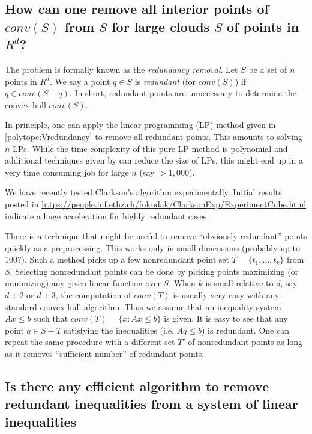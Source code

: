 \documentclass[[a4paper,12pt]{article}
\begin{document}
\subsection{How can one remove all interior points of $conv(S)$ from $S$ 
for large clouds $S$ of points in $R^d$?}
\label{polytope:Vredundancy2}

The problem is formally known as the {\em redundancy removal}.
Let $S$ be a set of $n$ points in $R^d$.
We say a point $q \in S$ is {\em redundant\/} (for $conv(S)$) if
$q \in conv(S-q)$.   In short, redundant points are unnecessary
to determine the convex hull $conv(S)$.

In principle, one can apply the linear programming (LP)
 method given in \ref{polytope:Vredundancy}
to remove all redundant points.  This amounts to solving $n$ LPs.
  While the time complexity of this pure LP method is polynomial and
additional techniques given by \cite{c-mosga-94,oss-eephd-95} 
can reduce the size of LPs, 
this might end up in
 a very time consuming job for large $n$ (say $>1,000$).
 
 We have recently tested Clarkson's algorithm \cite{c-mosga-94} 
 experimentally.  Initial results posted in 
\url{https://people.inf.ethz.ch/fukudak/ClarksonExp/ExperimentCube.html}\\
indicate a huge acceleration for highly redundant cases. 

There is a technique that might be useful to remove
``obviously redundant'' points quickly as a preprocessing.
This works only in small dimensions (probably up to $100$?).
Such a method 
picks up a few nonredundant point set $T=\{t_1, \ldots, t_k\}$ from $S$.
Selecting nonredundant points can be done by picking points 
maximizing (or minimizing) any given linear function over $S$.
When $k$ is small relative to $d$, say $d+2$ or $d+3$, the computation
of $conv(T)$ is usually very easy with any standard convex hull
algorithm.   Thus we assume that  an inequality
system $A x \le b$ such that $conv(T)=\{x: A x \le b\}$ is given.
It is easy to see that any point $q \in S-T$ satisfying
the inequalities (i.e. $A q \le b$) is redundant. 
One can repeat the same procedure with a different set
$T'$ of nonredundant points as long as it removes 
``sufficient number'' of redundant points.

\subsection{Is there any efficient algorithm to remove
redundant inequalities from a system of linear inequalities}
\label{polytope:Hredundancy}
\end{document}
